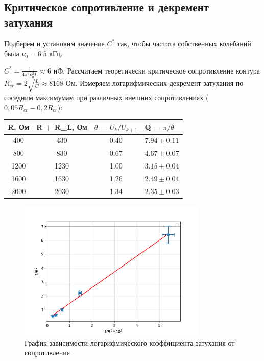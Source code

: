 \documentclass[a4paper]{article}
\begin{document}
\subsection{Критическое сопротивление и декремент затухания}

Подберем и установим значение $C^*$ так, 
чтобы частота собственных колебаний была 
$\nu_0 = 6.5$ кГц. 

\noindent
$C^* = \frac{1}{4\pi^2\nu_0^2L} \approx 6$ нФ. Рассчитаем теоретически критическое сопротивление контура $R_{cr} = 2\sqrt{\frac{L}{C}} \approx 8168$ Ом.
Измеряем логарифмических декремент затухания по соседним максимумам при различных внешних сопротивлениях ($0,05 R_{cr} - 0,2R_{cr}$):

\begin{table}[h!]
\centering
\begin{tabular}{|c|c|c|c|}
\hline
\multicolumn{1}{|l|}{R, Ом} & \multicolumn{1}{l|}{R + R\_L, Ом} & \multicolumn{1}{l|}{$\theta$ = $U_k/U_{k+1}$} & \multicolumn{1}{l|}{Q = $\pi/\theta$} \\ \hline
400  & 430  & 0.40 & $ 7.94 \pm 0.11$\\ \hline
800  & 830  & 0.67 & $ 4.67 \pm 0.07$\\ \hline
1200 & 1230 & 1.00 & $ 3.15 \pm 0.04$\\ \hline
1600 & 1630 & 1.26 & $ 2.49 \pm 0.04$\\ \hline
2000 & 2030 & 1.34 & $ 2.35 \pm 0.03$\\ \hline
\end{tabular}
\end{table}

\begin{figure}[h!]
\centering
\includegraphics[width=0.8\textwidth]{Figure_1.png}
\caption{График зависимости логарифмического коэффициента затухания от сопротивления}
\end{figure}
\end{document}
